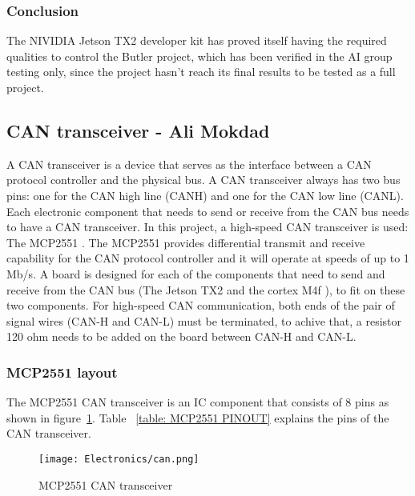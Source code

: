 \subsubsection{Conclusion}
The NIVIDIA Jetson TX2 developer kit has proved itself having the required qualities to control the Butler project, which has been verified in the AI group testing only, since the project hasn't reach its final results to be tested as a full project.





\subsection{CAN transceiver - Ali Mokdad} \label{CANtransceiver}

A CAN transceiver is a device that serves as the interface between a CAN protocol controller and the physical bus. A CAN transceiver always has two bus pins: one for the CAN high line (CANH) and one for the CAN low line (CANL). Each electronic component that needs to send or receive from the CAN bus needs to have a CAN transceiver. In this project, a high-speed CAN transceiver is used: The MCP2551 \cite{Types2010}. The MCP2551 provides differential transmit and receive capability for the CAN protocol controller and it will operate at speeds of up to 1 Mb/s. A board is designed for each of the components that need to send and receive from the CAN bus (The Jetson TX2 \cite{Board} and the cortex M4f \cite{She2013}), to fit on these two components.
For high-speed CAN communication, both ends of the pair of signal wires (CAN-H and CAN-L) must be terminated, to achive that, a resistor 120 ohm needs to be added on the board between CAN-H and CAN-L.



\subsubsection{MCP2551 layout}
The MCP2551 CAN transceiver is an IC component that consists of 8 pins as shown in figure~\ref{fig: MCP2551 CAN transceiver}. Table ~\ref{table: MCP2551 PINOUT} explains the pins of the CAN transceiver.
\begin{figure}[h!]
\centering
\texttt{[image: Electronics/can.png]}
\caption{MCP2551 CAN transceiver}
\label{fig: MCP2551 CAN transceiver}
\end{figure}

